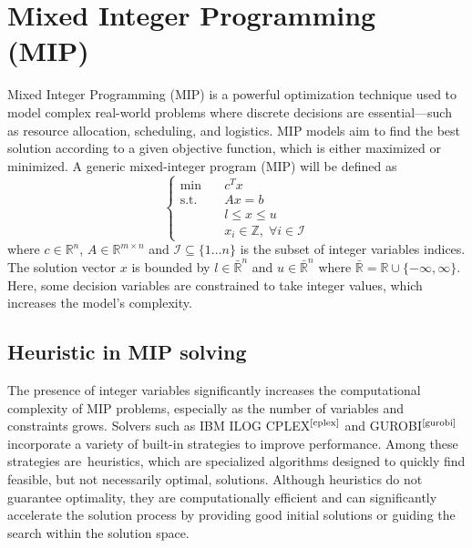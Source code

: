 \section{Mixed Integer Programming (MIP)}
Mixed Integer Programming (MIP) is a powerful optimization technique used to model complex real-world problems where discrete decisions are essential—such as resource allocation, scheduling, and logistics.
MIP models aim to find the best solution according to a given objective function, which is either maximized or minimized.
A generic mixed-integer program (MIP) will be defined as
\begin{equation}
\begin{cases}
\text{min} \quad & c^T x \\
\text{s.t.} \quad & Ax = b \\
                        & l \le x \le u \\
                        & x_i \in \mathbb{Z},\; \forall i \in \mathcal{I}   
\end{cases}
\end{equation}
where $c \in \mathbb{R}^n$, $A \in \mathbb{R}^{m \times n}$ and $\mathcal{I}\subseteq\{1\dots n\}$ is the subset of integer variables indices. The solution vector $x$ is bounded by $l \in \bar{\mathbb{R}}^n$ and $u \in \bar{\mathbb{R}}^n$ where $\bar{\mathbb{R}}= \mathbb{R} \cup \{-\infty,\infty\}$.
Here, some decision variables are constrained to take integer values, which increases the model’s complexity.
\subsection{Heuristic in MIP solving}
The presence of integer variables significantly increases the computational complexity of MIP problems, especially as the number of variables and constraints grows. Solvers such as IBM ILOG CPLEX$^\text{\cite{cplex}}$ and GUROBI$^\text{\cite{gurobi}}$ incorporate a variety of built-in strategies to improve performance. Among these strategies are heuristics, which are specialized algorithms designed to quickly find feasible, but not necessarily optimal, solutions. Although heuristics do not guarantee optimality, they are computationally efficient and can significantly accelerate the solution 
process by providing good initial solutions or guiding the search within the solution space.

